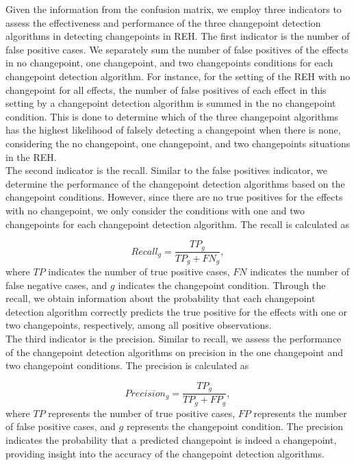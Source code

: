 \documentclass[]{interact}
\theoremstyle{plain}%
\theoremstyle{definition}
\theoremstyle{remark}
\begin{document}
	Given the information from the confusion matrix, we employ three indicators to assess the effectiveness and performance of the three changepoint detection algorithms in detecting changepoints in REH. The first indicator is the number of false positive cases. We separately sum the number of false positives of the effects in no changepoint, one changepoint, and two changepoints conditions for each changepoint detection algorithm. For instance, for the setting of the REH with no changepoint for all effects, the number of false positives of each effect in this setting by a changepoint detection algorithm is summed in the no changepoint condition. This is done to determine which of the three changepoint algorithms has the highest likelihood of falsely detecting a changepoint when there is none, considering the no changepoint, one changepoint, and two changepoints situations in the REH. \\
	
	The second indicator is the recall. Similar to the false positives indicator, we determine the performance of the changepoint detection algorithms based on the changepoint conditions. However, since there are no true positives for the effects with no changepoint, we only consider the conditions with one and two changepoints for each changepoint detection algorithm. The recall is calculated as
	
	\begin{equation} \label{7}
		Recall_g = \frac{TP_g}{TP_g + FN_g},
	\end{equation}
    where $TP$ indicates the number of true positive cases, $FN$ indicates the number of false negative cases, and $g$ indicates the changepoint condition. Through the recall, we obtain information about the probability that each changepoint detection algorithm correctly predicts the true positive for the effects with one or two changepoints, respectively, among all positive observations. \\

    The third indicator is the precision. Similar to recall, we assess the performance of the changepoint detection algorithms on precision in the one changepoint and two changepoint conditions. The precision is calculated as
 
    \begin{equation} \label{8}
    	Precision_g = \frac{TP_g}{TP_g + FP_g},
    \end{equation}
	where $TP$ represents the number of true positive cases, $FP$ represents the number of false positive cases, and $g$ represents the changepoint condition. The precision indicates the probability that a predicted changepoint is indeed a changepoint, providing insight into the accuracy of the changepoint detection algorithms.
	
\end{document}
